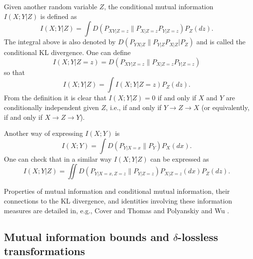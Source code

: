 \documentclass[11pt]{article}
\def\EXP {{\mathbb E}}
\begin{document}
Given another random variable $Z$, the conditional mutual information $I(X;Y|Z)$ is defined as
\[
I(X;Y|Z)  = \int D(P_{XY|Z=z}\|P_{X|Z=z}P_{Y|Z=z}) P_Z(dz).
\]
The  integral above is also denoted by $D(P_{YX|Z}\|P_{Y|Z} P_{X|Z}| P_Z)$ and
is called the conditional KL divergence. One can define
\[
I(X;Y|Z=z)=  D(P_{XY|Z=z}\|P_{X|Z=z}P_{Y|Z=z}) 
\]
so that
\begin{equation}
  \label{cond-inf-def}
I(X;Y|Z)  = \int I(X;Y|Z=z) P_Z(dz).
\end{equation}
From the definition it is clear that
$I(X;Y|Z)=0$ if and only if $X$ and $Y$ are conditionally independent given $Z$,
i.e., if and only if $Y\to Z\to X$ (or equivalently, if and only if  $X\to Z\to Y$). 


Another way of expressing $I(X;Y)$ is
\begin{equation}
\label{idefalt}
  I(X;Y)= \int D(P_{Y|X=x}\| P_{Y}) P_X(dx). 
\end{equation}
One can check that in a similar way  $I(X;Y|Z)$ can be expressed
as
\begin{equation}
  \label{cond-inf-def1}
 I(X;Y|Z)  =     \iint  D(P_{Y|X=x,Z=z}\| P_{Y|Z=z}) P_{X|Z=z}(dx) P_Z(dz) .
\end{equation}


Properties of mutual information and conditional
mutual information, their connections to the KL divergence, and identities
involving these information measures are detailed in, e.g., 
Cover and Thomas \cite[Chapter~2]{CoTh06} and
Polyanskiy and Wu \cite[Chapter~3]{PoWu22}.



\subsection{Mutual information bounds and  $\delta$-lossless transformations}



\end{document}
